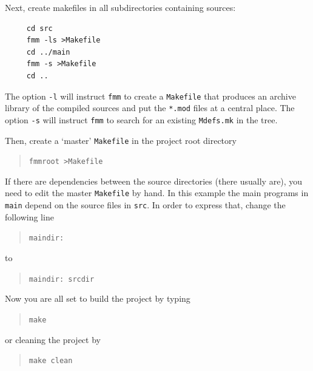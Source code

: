 Next, create makefiles in all subdirectories containing sources:
\begin{verbatim}
     cd src
     fmm -ls >Makefile
     cd ../main
     fmm -s >Makefile
     cd ..
\end{verbatim}
The option \texttt{-l} will instruct
\texttt{fmm} to create a \texttt{Makefile} that produces an archive library
of the compiled sources and put the \texttt{*.mod} files at a central place.
The option \texttt{-s} will instruct \texttt{fmm} to search for an existing
\texttt{Mdefs.mk} in the tree.

Then, create a `master' \texttt{Makefile} in the project root directory
\begin{quote}
   \texttt{fmmroot >Makefile}
\end{quote}
If there are dependencies between the source directories (there usually are),
you need to edit the master \texttt{Makefile} by hand. In this example the
main programs in \texttt{main} depend on the source files in \texttt{src}.
In order to express that, change the following line 
\begin{quote}
  \texttt{maindir:}
\end{quote}
to
\begin{quote}
   \texttt{maindir: srcdir}
\end{quote}
Now you are all set to build the project by typing
\begin{quote}
   \texttt{make}
\end{quote}
or cleaning the project by
\begin{quote}
   \texttt{make clean}
\end{quote}


